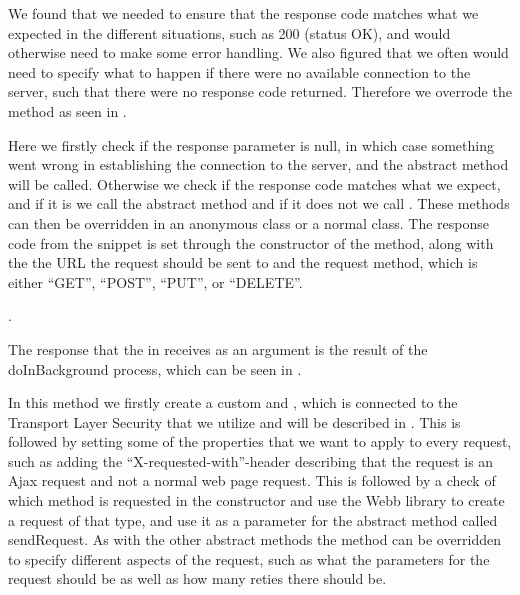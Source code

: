 We found that we needed to ensure that the response code matches what we expected in the different situations, such as 200 (status OK), and would otherwise need to make some error handling. We also figured that we often would need to specify what to happen if there were no available connection to the server, such that there were no response code returned. Therefore we overrode the  method as seen in . 



Here we firstly check if the response parameter is null, in which case something went wrong in establishing the connection to the server, and the abstract method  will be called. Otherwise we check if the response code matches what we expect, and if it is we call the abstract method  and if it does not we call . These methods can then be overridden in an anonymous class or a normal class. The response code from the snippet is set through the constructor of the method, along with the the URL the request should be sent to and the request method, which is either ``GET'', ``POST'', ``PUT'', or ``DELETE''. 

.

The response that the  in  receives as an argument is the result of the doInBackground process, which can be seen in . 



In this method we firstly create a custom  and , which is connected to the Transport Layer Security that we utilize and will be described in . This is followed by setting some of the properties that we want to apply to every request, such as adding the ``X-requested-with''-header describing that the request is an Ajax request and not a normal web page request. This is followed by a check of which method is requested in the constructor and use the Webb library to create a request of that type, and use it as a parameter for the abstract method called sendRequest. As with the other abstract methods the  method can be overridden to specify different aspects of the request, such as what the parameters for the request should be as well as how many reties there should be.